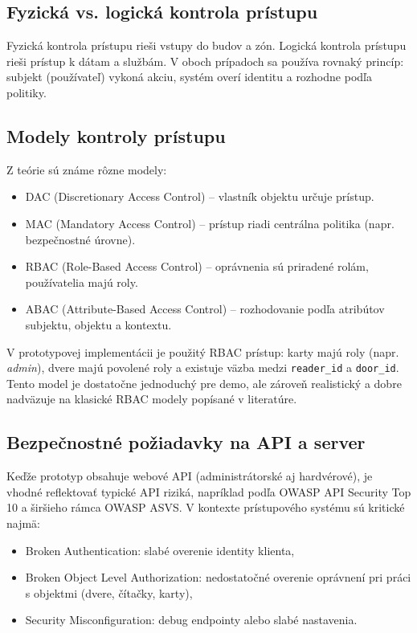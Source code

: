 \documentclass[journal,a4paper,onecolumn]{IEEEtran}
\begin{document}
\subsection{Fyzická vs. logická kontrola prístupu}

Fyzická kontrola prístupu rieši vstupy do budov a zón. Logická kontrola prístupu rieši prístup k dátam a službám. V oboch prípadoch sa používa rovnaký princíp: subjekt (používateľ) vykoná akciu, systém overí identitu a rozhodne podľa politiky.\cite{NISTRBACModel}

\subsection{Modely kontroly prístupu}

Z teórie sú známe rôzne modely:

\begin{itemize}[leftmargin=*,itemsep=2pt]
  \item DAC (Discretionary Access Control) -- vlastník objektu určuje prístup.
  \item MAC (Mandatory Access Control) -- prístup riadi centrálna politika (napr. bezpečnostné úrovne).
  \item RBAC (Role-Based Access Control) -- oprávnenia sú priradené rolám, používatelia majú roly.
  \item ABAC (Attribute-Based Access Control) -- rozhodovanie podľa atribútov subjektu, objektu a kontextu.
\end{itemize}

V prototypovej implementácii je použitý RBAC prístup: karty majú roly (napr. \emph{admin}), dvere majú povolené roly a existuje väzba medzi \texttt{reader\_id} a \texttt{door\_id}. Tento model je dostatočne jednoduchý pre demo, ale zároveň realistický a dobre nadväzuje na klasické RBAC modely popísané v literatúre.\cite{NISTRBACModel,SandhuRBAC1996}

\subsection{Bezpečnostné požiadavky na API a server}

Keďže prototyp obsahuje webové API (administrátorské aj hardvérové), je vhodné reflektovať typické API riziká, napríklad podľa OWASP API Security Top 10 a širšieho rámca OWASP ASVS.\cite{OWASPAPI2023,OWASPASVS} V kontexte prístupového systému sú kritické najmä:

\begin{itemize}[leftmargin=*,itemsep=2pt]
  \item Broken Authentication: slabé overenie identity klienta,
  \item Broken Object Level Authorization: nedostatočné overenie oprávnení pri práci s objektmi (dvere, čítačky, karty),
  \item Security Misconfiguration: debug endpointy alebo slabé nastavenia.
\end{itemize}
\end{document}
